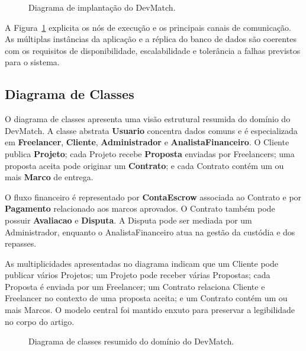 \begin{figure}[!htbp]
\centering
{}
\caption{Diagrama de implantação do DevMatch.}
\label{fig:implantacao}
\end{figure}

A Figura~\ref{fig:implantacao} explicita os nós de execução e os principais canais de comunicação. As múltiplas instâncias da aplicação e a réplica do banco de dados são coerentes com os requisitos de disponibilidade, escalabilidade e tolerância a falhas previstos para o sistema.

\subsection{Diagrama de Classes}
\label{sec:classes}

O diagrama de classes apresenta uma visão estrutural resumida do domínio do DevMatch. A classe abstrata \textbf{Usuario} concentra dados comuns e é especializada em \textbf{Freelancer}, \textbf{Cliente}, \textbf{Administrador} e \textbf{AnalistaFinanceiro}. O Cliente publica \textbf{Projeto}; cada Projeto recebe \textbf{Proposta} enviadas por Freelancers; uma proposta aceita pode originar um \textbf{Contrato}; e cada Contrato contém um ou mais \textbf{Marco} de entrega.

O fluxo financeiro é representado por \textbf{ContaEscrow} associada ao Contrato e por \textbf{Pagamento} relacionado aos marcos aprovados. O Contrato também pode possuir \textbf{Avaliacao} e \textbf{Disputa}. A Disputa pode ser mediada por um Administrador, enquanto o AnalistaFinanceiro atua na gestão da custódia e dos repasses.

As multiplicidades apresentadas no diagrama indicam que um Cliente pode publicar vários Projetos; um Projeto pode receber várias Propostas; cada Proposta é enviada por um Freelancer; um Contrato relaciona Cliente e Freelancer no contexto de uma proposta aceita; e um Contrato contém um ou mais Marcos. O modelo central foi mantido enxuto para preservar a legibilidade no corpo do artigo.

\begin{figure}[!htbp]
\centering
{}
\caption{Diagrama de classes resumido do domínio do DevMatch.}
\label{fig:classes}
\end{figure}
